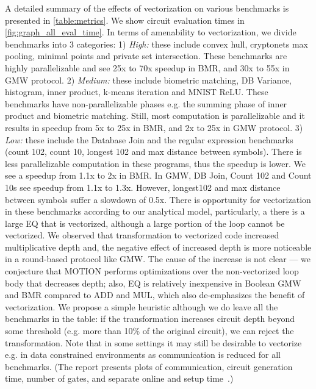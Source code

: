 \begin{figure*}[htbp]
\centering
\resizebox{0.7\textwidth}{!}{}
\caption{Circuit Evaluation Time (Setup + Online) of Benchmarks}
\label{fig:graph_all_eval_time}
\end{figure*}

A detailed summary of the effects of vectorization on various benchmarks is presented in \cref{table:metrics}. We show circuit evaluation times in \cref{fig:graph_all_eval_time}. In terms of amenability to vectorization, we divide benchmarks into 3 categories: 1) {\it High:} these include convex hull, cryptonets max pooling, minimal points and private set intersection. These benchmarks are highly parallelizable and see 25x to 70x speedup in BMR, and 30x to 55x in GMW protocol. 2) {\it Medium:} these include biometric matching, DB Variance, histogram, inner product, k-means iteration and MNIST ReLU. These benchmarks have non-parallelizable phases e.g. the summing phase of inner product and biometric matching. Still, most computation is parallelizable and it results in speedup from 5x to 25x in BMR, and 2x to 25x in GMW protocol. 3) {\it Low:} these include the Database Join and the regular expression benchmarks (count 102, count 10, longest 102 and max distance between symbols). There is less parallelizable computation in these programs, thus the speedup is lower. We see a speedup from 1.1x to 2x in BMR. In GMW, DB Join, Count 102 and Count 10s see speedup from 1.1x to 1.3x. However, longest102 and max distance between symbols suffer a slowdown of 0.5x. There is opportunity for vectorization in these benchmarks according to our analytical model, particularly, a there is a large EQ that is vectorized, although a large portion of the loop cannot be vectorized. We observed that transformation to vectorized code increased multiplicative depth and, the negative effect of increased depth is more noticeable in a round-based protocol like GMW. The cause of the increase is not clear --- we conjecture that MOTION performs optimizations over the non-vectorized loop body that decreases depth; also, EQ is relatively inexpensive in Boolean GMW and BMR compared to ADD and MUL, which also de-emphasizes the benefit of vectorization. We propose a simple heuristic although we do leave all the benchmarks in the table: if the transformation increases circuit depth beyond some threshold (e.g. more than 10\% of the original circuit), we can reject the transformation. %
Note that in some settings it may still be desirable to vectorize e.g. in data constrained environments as communication is reduced for all benchmarks. (The report presents plots of communication, circuit generation time, number of gates, and separate online and setup time~\cite{Anon_TR}.)%


